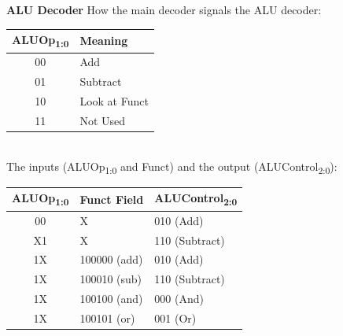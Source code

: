 \documentclass[12pt]{article}
\theoremstyle{definition}
\begin{document}
  \textbf{ALU Decoder}
  How the main decoder signals the ALU decoder: \\
  \begin{tabular} {c | l}
  ALUOp\textsubscript{1:0} & Meaning \\ \hline \hline
  00 & Add \\ \hline
  01 & Subtract \\ \hline
  10 & Look at Funct \\ \hline
  11 & Not Used \\ \hline
  \end{tabular} \\

  The inputs (ALUOp\textsubscript{1:0} and Funct) and the output (ALUControl\textsubscript{2:0}): \\
  \begin{tabular}{c | l | l}
  ALUOp\textsubscript{1:0} & Funct Field & ALUControl\textsubscript{2:0} \\ \hline \hline
  00 & X & 010 (Add) \\ \hline
  X1 & X & 110 (Subtract) \\ \hline
  1X & 100000 (add) & 010 (Add) \\ \hline
  1X & 100010 (sub) & 110 (Subtract) \\ \hline
  1X & 100100 (and) & 000 (And) \\ \hline
  1X & 100101 (or) & 001 (Or)
  \end{tabular}
\end{document}
